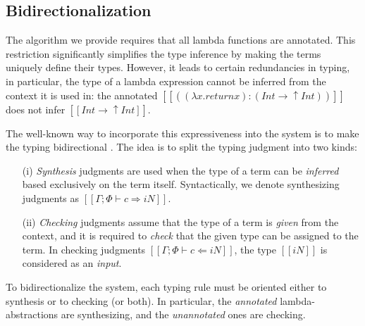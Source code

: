 \subsection{Bidirectionalization}






The algorithm we provide requires that all lambda functions are annotated. 
This restriction significantly simplifies the type inference by making the 
terms uniquely define their types. However, it leads to certain redundancies
in typing, in particular, the type of a lambda expression cannot be inferred 
from the context it is used in: the annotated $[[((λ x . return x) : (Int → ↑Int))]]$
does not infer $[[Int → ↑Int]]$.

The well-known way to incorporate this expressiveness into the system
is to make the typing bidirectional \cite{dunfield2020:bidirectional}.
The idea is to split the typing judgment into two kinds:
\begin{enumerate}
    \item[(i)] \emph{Synthesis} 
        judgments are used when the type of a term can be \emph{inferred}
        based exclusively on the term itself. 
        Syntactically, we denote synthesizing judgments
        as $[[Γ ; Φ ⊢ c ⇒ iN]]$.
    \item[(ii)] \emph{Checking} judgments 
        assume that the type of a term is \emph{given}
        from the context, and 
        it is required to \emph{check} that the given
        type can be assigned to the term.
        In checking judgments $[[Γ ; Φ ⊢ c ⇐ iN]]$, 
        the type $[[iN]]$ is considered as an \emph{input}.
\end{enumerate}

To bidirectionalize the system, each typing rule 
must be oriented either to synthesis or to checking (or both).
In particular, the \emph{annotated} lambda-abstractions are
synthesizing, and the \emph{unannotated} ones are checking.

